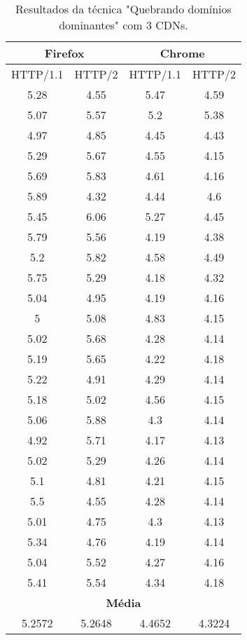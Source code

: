 \begin{table}[H]
	\centering
	\caption{Resultados da técnica "Quebrando domínios dominantes" com 3 CDNs.}
	\label{resultados-quebrandodominiosdominantes-3}
	\begin{tabular}{cccc}
		\hline
		\multicolumn{2}{c}{\textbf{Firefox}} & \multicolumn{2}{c}{\textbf{Chrome}} \\
		\hline
		HTTP/1.1 & HTTP/2 & HTTP/1.1 & HTTP/2 \\
		\hline
		5.28 & 4.55 & 5.47 & 4.59 \\
		5.07 & 5.57 & 5.2 & 5.38 \\
		4.97 & 4.85 & 4.45 & 4.43 \\
		5.29 & 5.67 & 4.55 & 4.15 \\
		5.69 & 5.83 & 4.61 & 4.16 \\
		5.89 & 4.32 & 4.44 & 4.6 \\
		5.45 & 6.06 & 5.27 & 4.45 \\
		5.79 & 5.56 & 4.19 & 4.38 \\
		5.2 & 5.82 & 4.58 & 4.49 \\
		5.75 & 5.29 & 4.18 & 4.32 \\
		5.04 & 4.95 & 4.19 & 4.16 \\
		5 & 5.08 & 4.83 & 4.15 \\
		5.02 & 5.68 & 4.28 & 4.14 \\
		5.19 & 5.65 & 4.22 & 4.18 \\
		5.22 & 4.91 & 4.29 & 4.14 \\
		5.18 & 5.02 & 4.56 & 4.15 \\
		5.06 & 5.88 & 4.3 & 4.14 \\
		4.92 & 5.71 & 4.17 & 4.13 \\
		5.02 & 5.29 & 4.26 & 4.14 \\
		5.1 & 4.81 & 4.21 & 4.15 \\
		5.5 & 4.55 & 4.28 & 4.14 \\
		5.01 & 4.75 & 4.3 & 4.13 \\
		5.34 & 4.76 & 4.19 & 4.14 \\
		5.04 & 5.52 & 4.27 & 4.16 \\
		5.41 & 5.54 & 4.34 & 4.18 \\
		\hline
		\multicolumn{4}{c}{\textbf{Média}} \\
		5.2572 & 5.2648 & 4.4652 & 4.3224 \\
		\hline
	\end{tabular}
\end{table}